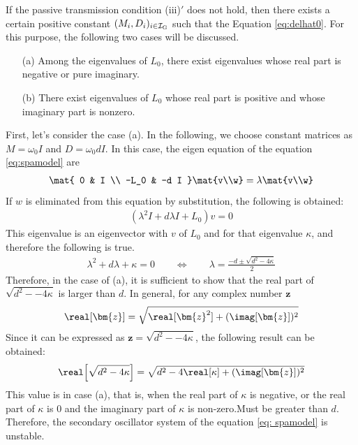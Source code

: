 \documentclass[tombow,dvipdfmx]{corona-a5-1.1}
\begin{document}
\begin{証明}
If the passive transmission condition (iii)$'$ does not hold, then there exists a certain positive constant $(M_i,D_i)_{i \in \mathcal{I}_{\rm G}}$ such that the Equation \ref{eq:delhat0}.
For this purpose, the following two cases will be discussed.
\begin{itemize}
\item[(a)] Among the eigenvalues of $L_0$, there exist eigenvalues whose real part is negative or pure imaginary.
\item[(b)] There exist eigenvalues of $L_0$ whose real part is positive and whose imaginary part is nonzero.
\end{itemize}
First, let's consider the case (a).
In the following, we choose constant matrices as $M=\omega_0 I$ and $D=\omega_0 d I$.
In this case, the eigen equation of the equation \ref{eq:spamodel} are
\begin{align*}
\mat{
0 & I \\
-L_0 & -d I
}
\mat{v\\w}
=
\lambda \mat{v\\w}
\end{align*}
If $ w $ is eliminated from this equation by substitution, the following is obtained:
\begin{align*}
\left(\lambda^2 I +d \lambda I + L_0
\right) v =0
\end{align*}
This eigenvalue is an eigenvector with $ v $ of $ L_0 $ and for that eigenvalue $ \kappa $, and therefore the following is true.
\begin{align}\label{eq:lamsq}
\lambda^2 + d\lambda +\kappa =0
\qquad
\Longleftrightarrow
\qquad
\lambda = \frac{-d \pm \sqrt{d^2-4\kappa} }{2}
\end{align}
Therefore, in the case of (a), it is sufficient to show that the real part of $ \sqrt{d^2--4\kappa} $ is larger than $ d $.
In general, for any complex number $ \bm{z} $
\begin{align*}
\real[\bm{z}] = \sqrt{ \real[\bm{z}^2 ] + (\imag[\bm{z}])^2 }
\end{align*}
Since it can be expressed as $ \bm{z} = \sqrt{d^2--4\kappa} $, the following result can be obtained:
\begin{align*}
\real \Bigl[
\sqrt{d^2 - 4\kappa }
\Bigr]
=\sqrt{
d^2 - 4 \real[\kappa]
+
(\imag[ \bm{z} ])^2
}
\end{align*}
This value is in case (a), that is, when the real part of $ \kappa $ is negative, or the real part of $ \kappa $ is 0 and the imaginary part of $ \kappa $ is non-zero.Must be greater than $ d $.
Therefore, the secondary oscillator system of the equation \ref{eq: spamodel} is unstable.


\end{証明}
\end{document}
